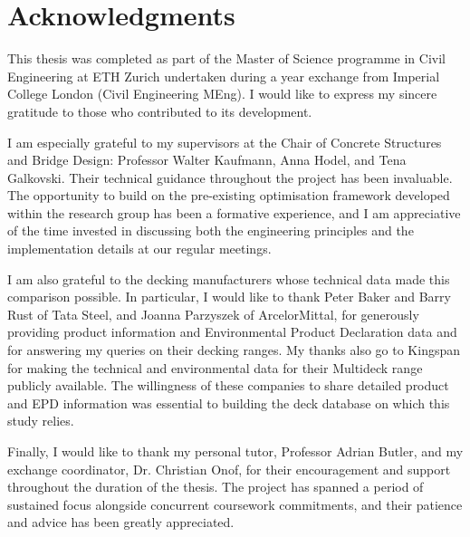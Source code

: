 \section*{Acknowledgments}

This thesis was completed as part of the Master of Science programme in Civil Engineering at ETH Zurich undertaken during a year exchange from Imperial College London (Civil Engineering MEng). I would like to express my sincere gratitude to those who contributed to its development.

I am especially grateful to my supervisors at the Chair of Concrete Structures and Bridge Design: Professor Walter Kaufmann, Anna Hodel, and Tena Galkovski. Their technical guidance throughout the project has been invaluable. The opportunity to build on the pre-existing optimisation framework developed within the research group has been a formative experience, and I am appreciative of the time invested in discussing both the engineering principles and the implementation details at our regular meetings.

I am also grateful to the decking manufacturers whose technical data made this comparison possible. In particular, I would like to thank Peter Baker and Barry Rust of Tata Steel, and Joanna Parzyszek of ArcelorMittal, for generously providing product information and Environmental Product Declaration data and for answering my queries on their decking ranges. My thanks also go to Kingspan for making the technical and environmental data for their Multideck range publicly available. The willingness of these companies to share detailed product and EPD information was essential to building the deck database on which this study relies.

Finally, I would like to thank my personal tutor, Professor Adrian Butler, and my exchange coordinator, Dr. Christian Onof, for their encouragement and support throughout the duration of the thesis. The project has spanned a period of sustained focus alongside concurrent coursework commitments, and their patience and advice has been greatly appreciated.

\vspace{12pt}